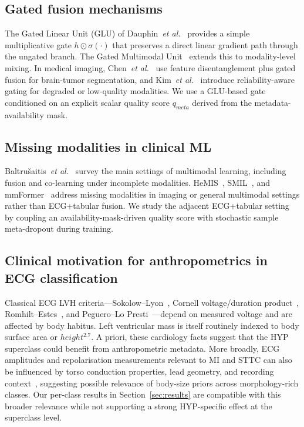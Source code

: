 \documentclass[mathematics,article,submit,pdftex]{Definitions/mdpi}
\def\mathrm#1{#1}%
\def\mathbf#1{#1}%
\def\emph#1{#1}%
\begin{document}
\subsection{Gated fusion mechanisms}
The Gated Linear Unit (GLU) of Dauphin~\textit{et al.}~\cite{Dauphin2017} provides a simple multiplicative gate $\mathbf{h} \odot \sigma(\cdot)$ that preserves a direct linear gradient path through the ungated branch. The Gated Multimodal Unit~\cite{Arevalo2020} extends this to modality-level mixing. In medical imaging, Chen~\textit{et al.}~\cite{Chen2019MICCAI} use feature disentanglement plus gated fusion for brain-tumor segmentation, and Kim~\textit{et al.}~\cite{Kim2018ACCV} introduce reliability-aware gating for degraded or low-quality modalities. We use a GLU-based gate conditioned on an explicit scalar quality score $q_{\mathrm{meta}}$ derived from the metadata-availability mask.

\subsection{Missing modalities in clinical ML}
Baltru{\v{s}}aitis~\textit{et al.}~\cite{Baltrusaitis2019} survey the main settings of multimodal learning, including fusion and co-learning under incomplete modalities. HeMIS~\cite{Havaei2016}, SMIL~\cite{Ma2021}, and mmFormer~\cite{Zhang2022} address missing modalities in imaging or general multimodal settings rather than ECG+tabular fusion. We study the adjacent ECG+tabular setting by coupling an availability-mask-driven quality score with stochastic sample meta-dropout during training.

\subsection{Clinical motivation for anthropometrics in ECG classification}
Classical ECG LVH criteria---Sokolow--Lyon~\cite{Sokolow1949}, Cornell voltage/duration product~\cite{Casale1985}, Romhilt--Estes~\cite{Romhilt1968}, and Peguero--Lo Presti~\cite{Peguero2017}---depend on measured voltage and are affected by body habitus. Left ventricular mass is itself routinely indexed to body surface area or $\mathrm{height}^{2.7}$. \emph{A priori}, these cardiology facts suggest that the HYP superclass could benefit from anthropometric metadata. More broadly, ECG amplitudes and repolarisation measurements relevant to MI and STTC can also be influenced by torso conduction properties, lead geometry, and recording context~\cite{Rautaharju2009, MacFarlane2011}, suggesting possible relevance of body-size priors across morphology-rich classes. Our per-class results in Section~\ref{sec:results} are compatible with this broader relevance while not supporting a strong HYP-specific effect at the superclass level.
\end{document}
